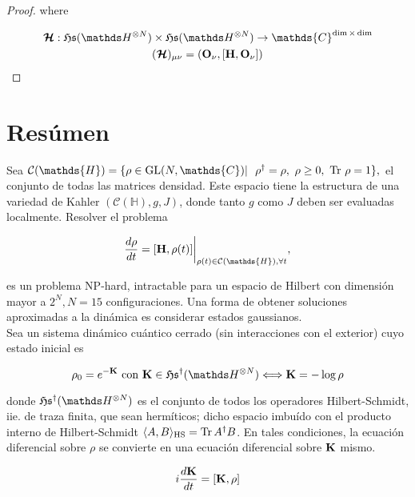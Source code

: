 \documentclass{homework}
\begin{document}
\begin{proof}
where 

\begin{align*}
    \bm{\mathcal{H}} : \mathfrak{H}\mathfrak{s}(\hilbert^{\otimes N}) & \times \mathfrak{H}\mathfrak{s}(\hilbert^{\otimes N}) \rightarrow \mathds{C}^{\dim \times \dim} \\
    & (\bm{\mathcal{H}})_{\mu \nu} = ({\bf O}_{\nu}, [{\bf H}, {\bf O}_{\nu}])
\end{align*}
    
\end{proof}

\clearpage

\section{Resúmen}

Sea $\mathcal{C}(\mathds{H}) = \{ \rho \in \textnormal{GL}(N, \mathds{C}) | \blanky
\blanky \rho^\dagger = \rho, 
\blanky \rho \geq 0, \blanky \textnormal{Tr } \rho = 1 \},$ el conjunto de todas las matrices densidad. Este espacio tiene la estructura de una variedad de Kahler $(\mathcal{C}(\mathds{H}), g, J)$, donde tanto $g$ como $J$ deben ser evaluadas localmente. Resolver el problema 

$$
    \frac{d\rho}{dt}
    = [{\bf H}, \rho(t)]\bigg|_{\rho(t) \in \mathcal{C}(\mathds{H}), \forall t},
$$

es un problema NP-hard, intractable para un espacio de Hilbert con dimensión mayor a $2^{N}, N = 15$ configuraciones. Una forma de obtener soluciones aproximadas a la dinámica es considerar estados gaussianos. \\

Sea un sistema dinámico cuántico cerrado (sin interacciones con el exterior) cuyo estado inicial es 

$$
\rho_0 = e^{-{\bf K}} \textnormal{ con ${\bf K} \in \mathfrak{H}\mathfrak{s}^\dagger(\hilbert^{\otimes N})$} \Longleftrightarrow {\bf K} = - \log \rho
$$

donde $\mathfrak{H}\mathfrak{s}^\dagger(\hilbert^{\otimes N})$ es el conjunto de todos los operadores Hilbert-Schmidt, iie. de traza finita, que sean hermíticos; dicho espacio imbuído con el producto interno de Hilbert-Schmidt $\langle A, B \rangle_{\textnormal{HS}} = \Tr A^\dagger B$. En tales condiciones, la ecuación diferencial sobre $\rho$ se convierte en una ecuación diferencial sobre ${\bf K}$ mismo.

$$
i \frac{d {\bf K}}{dt} =  [{\bf K}, \rho]
$$
\end{document}
